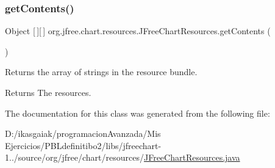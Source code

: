 \subsubsection{\texorpdfstring{get\+Contents()}{getContents()}}
{\footnotesize\ttfamily Object \mbox{[}$\,$\mbox{]}\mbox{[}$\,$\mbox{]} org.\+jfree.\+chart.\+resources.\+J\+Free\+Chart\+Resources.\+get\+Contents (\begin{DoxyParamCaption}{ }\end{DoxyParamCaption})}

Returns the array of strings in the resource bundle.

\begin{DoxyReturn}{Returns}
The resources. 
\end{DoxyReturn}


The documentation for this class was generated from the following file\+:\begin{DoxyCompactItemize}
\item 
D\+:/ikasgaiak/programacion\+Avanzada/\+Mis Ejercicios/\+P\+B\+Ldefinitibo2/libs/jfreechart-\/1../source/org/jfree/chart/resources/\mbox{\hyperlink{_j_free_chart_resources_8java}{J\+Free\+Chart\+Resources.\+java}}\end{DoxyCompactItemize}
